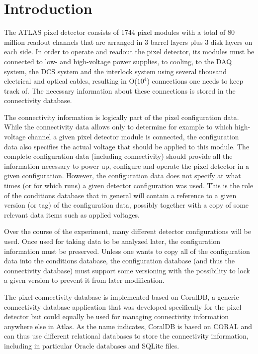 
\section{Introduction}


The ATLAS pixel detector consists of 1744 pixel modules with a total
of 80 million readout channels that are arranged in 3 barrel layers
plus 3 disk layers on each side. In order to operate and readout the
pixel detector, its modules must be connected to low- and high-voltage
power supplies, to cooling, to the DAQ system, the DCS system and the
interlock system using several thousand electrical and optical
cables, resulting in O($10^4$) connections one needs to keep track of.
The necessary information about these connections is stored in the
connectivity database.

The connectivity information is logically part of the pixel
configuration data. While the connectivity data allows only to
determine for example to which high-voltage channel a given pixel
detector module is connected, the configuration data also specifies
the actual voltage that should be applied to this module. The complete
configuration data (including connectivity) should provide all the
information necessary to power up, configure and operate the pixel
detector in a given configuration. However, the configuration data
does not specify at what times (or for which runs) a given detector
configuration was used. This is the role of the conditions database
that in general will contain a reference to a given version (or tag)
of the configuration data, possibly together with a copy of some
relevant data items such as applied voltages.

Over the course of the experiment, many different detector
configurations will be used. Once used for taking data to be analyzed
later, the configuration information must be preserved. Unless one
wants to copy all of the configuration data into the conditions
database, the configuration database (and thus the connectivity
database) must support some versioning with the possibility to lock a
given version to prevent it from later modification.

The pixel connectivity database is implemented based on CoralDB, a
generic connectivity database application that was developed
specifically for the pixel detector but could equally be used for managing
connectivity information anywhere else in Atlas.  As the name
indicates, CoralDB is based on CORAL \cite{CORAL} and can thus
use different relational databases to store the connectivity
information, including in particular Oracle databases and SQLite
files.

